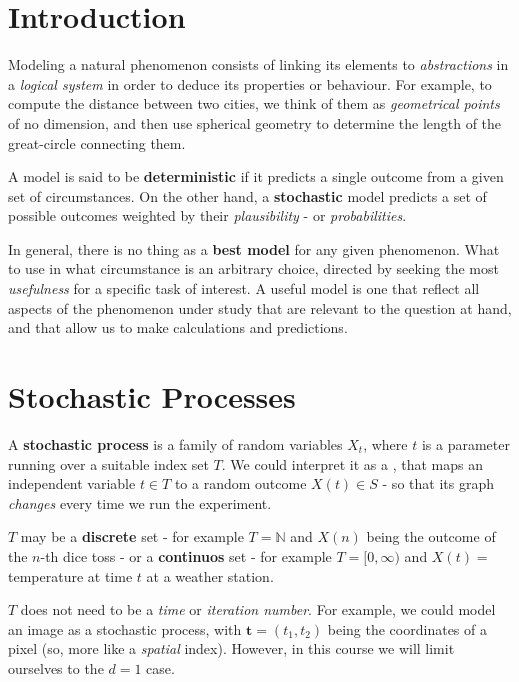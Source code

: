 \documentclass[../template.tex]{subfiles}
\begin{document}
\section{Introduction}
Modeling a natural phenomenon consists of linking its elements to \textit{abstractions} in a \textit{logical system} in order to deduce its properties or behaviour. For example, to compute the distance between two cities, we think of them as \textit{geometrical points} of no dimension, and then use spherical geometry to determine the length of the great-circle connecting them.  

\medskip

A model is said to be \textbf{deterministic} if it predicts a single outcome from a given set of circumstances. On the other hand, a \textbf{stochastic} model predicts a set of possible outcomes weighted by their \textit{plausibility} - or \textit{probabilities}.   

\medskip

In general, there is no thing as a \textbf{best model} for any given phenomenon. What to use in what circumstance is an arbitrary choice, directed by seeking the most \textit{usefulness} for a specific task of interest. A useful model is one that reflect all aspects of the phenomenon under study that are relevant to the question at hand, and that allow us to make calculations and predictions.

\section{Stochastic Processes}
A \textbf{stochastic process} is a family of random variables $X_t$, where $t$ is a parameter running over a suitable index set $T$. We could interpret it as a , that maps an independent variable $t \in T$ to a random outcome $X(t) \in S$ - so that its graph \textit{changes} every time we run the experiment.  

\medskip

$T$ may be a \textbf{discrete}  set - for example $T = \mathbb{N}$ and $X(n)$ being the outcome of the $n$-th dice toss - or a \textbf{continuos} set - for example $T=[0,\infty)$ and $X(t) = $ temperature at time $t$ at a weather station. \medskip

$T$ does not need to be a \textit{time} or \textit{iteration number}. For example, we could model an image as a stochastic process, with $\bm{t} = (t_1,t_2)$ being the coordinates of a pixel (so, more like a \textit{spatial} index). However, in this course we will limit ourselves to the $d=1$ case.
\end{document}
